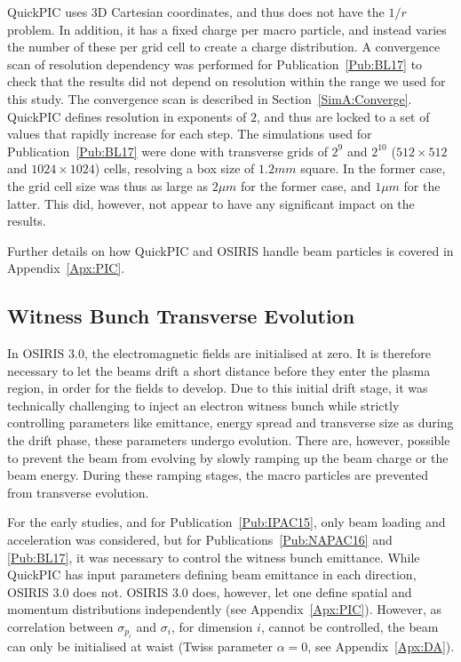 QuickPIC uses 3D Cartesian coordinates, and thus does not have the $1/r$ problem.
In addition, it has a fixed charge per macro particle, and instead varies the number of these per grid cell to create a charge distribution.
A convergence scan of resolution dependency was performed for Publication~\ref{Pub:BL17} to check that the results did not depend on resolution within the range we used for this study. The convergence scan is described in Section~\ref{SimA:Converge}.
QuickPIC defines resolution in exponents of $2$, and thus are locked to a set of values that rapidly increase for each step.
The simulations used for Publication~\ref{Pub:BL17} were done with transverse grids of $2^9$ and $2^10$ ($512 \times 512$ and $1024 \times 1024$) cells, resolving a box size of $1.2\unit{mm}$ square.
In the former case, the grid cell size was thus as large as $2\unit{\mu m}$ for the former case, and $1\unit{\mu m}$ for the latter.
This did, however, not appear to have any significant impact on the results.

Further details on how QuickPIC and OSIRIS handle beam particles is covered in Appendix~\ref{Apx:PIC}.

\subsection{Witness Bunch Transverse Evolution}
\label{Sim:EBeam:TEvol}

In OSIRIS 3.0, the electromagnetic fields are initialised at zero.
It is therefore necessary to let the beams drift a short distance before they enter the plasma region, in order for the fields to develop.
Due to this initial drift stage, it was technically challenging to inject an electron witness bunch while strictly controlling parameters like emittance, energy spread and transverse size as during the drift phase, these parameters undergo evolution.
There are, however, possible to prevent the beam from evolving by slowly ramping up the beam charge or the beam energy.
During these ramping stages, the macro particles are prevented from transverse evolution.

For the early studies, and for Publication~\ref{Pub:IPAC15}, only beam loading and acceleration was considered, but for Publications~\ref{Pub:NAPAC16} and \ref{Pub:BL17}, it was necessary to control the witness bunch emittance.
While QuickPIC has input parameters defining beam emittance in each direction, OSIRIS 3.0 does not.
OSIRIS 3.0 does, however, let one define spatial and momentum distributions independently (see Appendix~\ref{Apx:PIC}).
However, as correlation between $\sigma_{p_{i}}$ and $\sigma_{i}$, for dimension $i$, cannot be controlled, the beam can only be initialised at waist (Twiss parameter $\alpha = 0$, see Appendix~\ref{Apx:DA}).

